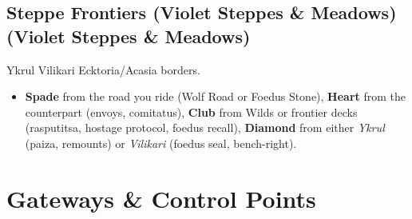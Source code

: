 \documentclass[11pt]{article}
\newcommand{\SuitSpade}{\textbf{Spade}} %
\newcommand{\SuitHeart}{\textbf{Heart}} %
\newcommand{\SuitClub}{\textbf{Club}}   %
\newcommand{\SuitDiamond}{\textbf{Diamond}} %
\begin{document}
\subsection{Steppe Frontiers (Violet Steppes & Meadows) (Violet Steppes & Meadows)}
Ykrul \leftrightarrow{} Vilikari \leftrightarrow{} Ecktoria/Acasia borders.
\begin{itemize}
  \item \SuitSpade{} from the road you ride (Wolf Road or Foedus Stone), \SuitHeart{} from the counterpart (envoys, comitatus), \SuitClub{} from Wilds or frontier decks (rasputitsa, hostage protocol, foedus recall), \SuitDiamond{} from either \emph{Ykrul} (paiza, remounts) or \emph{Vilikari} (foedus seal, bench-right).
\end{itemize}

\section{Gateways & Control Points}
\end{document}
